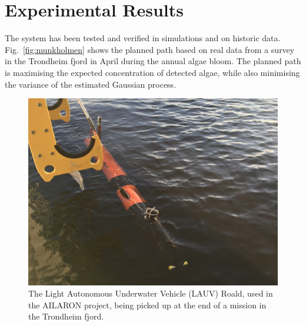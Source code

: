 \documentclass[conference]{IEEEtran}
\begin{document}
\section{Experimental Results}
The system has been tested and verified in simulations and on historic data. Fig.~\ref{fig:munkholmen} shows the planned path based on real data from a survey in the Trondheim fjord in April during the annual algae bloom. The planned path is maximising the expected concentration of detected algae, while also minimising the variance of the estimated Gaussian process.
\begin{figure}[tbp]
\centerline{\includegraphics[width=\linewidth]{figures/Roald.jpeg}}
\caption{The Light Autonomous Underwater Vehicle (LAUV) Roald, used in the AILARON project, being picked up at the end of a mission in the Trondheim fjord.}
\label{fig:roald}
\end{figure}
\end{document}
